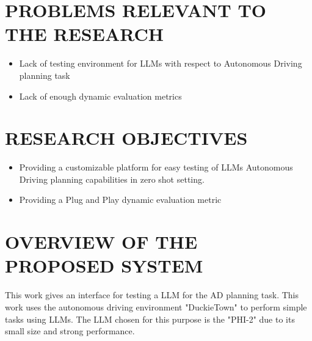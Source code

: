  
\begin{spacing}{1.5} 
\begin{sloppypar}
\section{PROBLEMS RELEVANT TO THE RESEARCH}
\begin{itemize}
    \item Lack of testing environment for LLMs with respect to Autonomous Driving planning task
    \item Lack of enough dynamic evaluation metrics 
\end{itemize}

\section{RESEARCH OBJECTIVES}
\begin{itemize}
    \item Providing a customizable platform for easy testing of LLMs Autonomous Driving planning capabilities in zero shot setting.
    \item Providing a Plug and Play dynamic evaluation metric
\end{itemize}
\section{OVERVIEW OF THE PROPOSED SYSTEM}
This work gives an interface for testing a LLM for the AD planning task. This work uses the autonomous driving environment "DuckieTown" to perform simple tasks using LLMs. The LLM chosen for this purpose is the "PHI-2" due to its small size and strong performance.
\end{sloppypar}
 \end{spacing}
 
